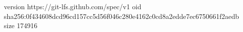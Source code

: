 version https://git-lfs.github.com/spec/v1
oid sha256:0f434608dcd96cd157cc5d56f046c280e4162c0cd8a2edde7ec6750661f2aedb
size 174916
